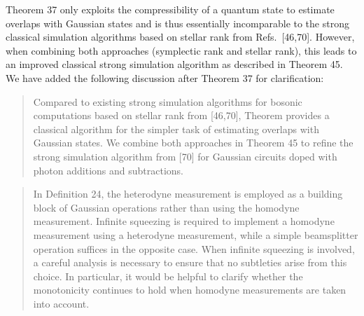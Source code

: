 \documentclass[a4paper,12pt]{article}
\newenvironment{Referee}[1]
{\noindent {\bf Comment #1:} \begin{quote} }
{\end{quote}\vspace{0 cm}}
\newenvironment{Response}
{\noindent \color{RawSienna}{\bf Response:} }
{\vspace{0.4 cm}}
\begin{document}
\begin{Response}
Theorem 37 only exploits the compressibility of a quantum state to estimate overlaps with Gaussian states and is thus essentially incomparable to the strong classical simulation algorithms based on stellar rank from Refs.\ [46,70]. However, when combining both approaches (symplectic rank and stellar rank), this leads to an improved classical strong simulation algorithm as described in Theorem 45. We have added the following discussion after Theorem 37 for clarification:
\begin{quote}
    Compared to existing strong simulation algorithms for bosonic computations based on stellar rank from [46,70], Theorem provides a classical algorithm for the simpler task of estimating overlaps with Gaussian states. We combine both approaches in Theorem 45 to refine the strong simulation algorithm from [70] for Gaussian circuits doped with photon additions and subtractions.
\end{quote}

\end{Response}

\begin{Referee}{3}
In Definition 24, the heterodyne measurement is employed as a building block of Gaussian operations rather than using the homodyne measurement. Infinite squeezing is required to implement a homodyne measurement using a heterodyne measurement, while a simple beamsplitter operation suffices in the opposite case. When infinite squeezing is involved, a careful analysis is necessary to ensure that no subtleties arise from this choice. In particular, it would be helpful to clarify whether the monotonicity continues to hold when homodyne measurements are taken into account.
\end{Referee}
\end{document}
